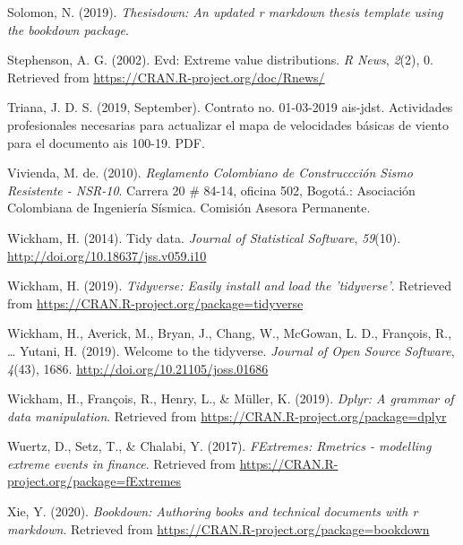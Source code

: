 \documentclass[12pt,oneside]{reedthesis}
\begin{document}
\leavevmode\hypertarget{ref-Solomon2019}{}%
Solomon, N. (2019). \emph{Thesisdown: An updated r markdown thesis template using the bookdown package}.

\leavevmode\hypertarget{ref-Stephenson2002}{}%
Stephenson, A. G. (2002). Evd: Extreme value distributions. \emph{R News}, \emph{2}(2), 0. Retrieved from \url{https://CRAN.R-project.org/doc/Rnews/}

\leavevmode\hypertarget{ref-triana2019}{}%
Triana, J. D. S. (2019, September). Contrato no. 01-03-2019 ais-jdst. Actividades profesionales necesarias para actualizar el mapa de velocidades básicas de viento para el documento ais 100-19. PDF.

\leavevmode\hypertarget{ref-nsr10}{}%
Vivienda, M. de. (2010). \emph{Reglamento Colombiano de Construccción Sismo Resistente - NSR-10}. Carrera 20 \# 84-14, oficina 502, Bogotá.: Asociación Colombiana de Ingeniería Sísmica. Comisión Asesora Permanente.

\leavevmode\hypertarget{ref-Wickham2014}{}%
Wickham, H. (2014). Tidy data. \emph{Journal of Statistical Software}, \emph{59}(10). \url{http://doi.org/10.18637/jss.v059.i10}

\leavevmode\hypertarget{ref-Wickham2019a}{}%
Wickham, H. (2019). \emph{Tidyverse: Easily install and load the 'tidyverse'}. Retrieved from \url{https://CRAN.R-project.org/package=tidyverse}

\leavevmode\hypertarget{ref-Wickham2019b}{}%
Wickham, H., Averick, M., Bryan, J., Chang, W., McGowan, L. D., François, R., \ldots{} Yutani, H. (2019). Welcome to the tidyverse. \emph{Journal of Open Source Software}, \emph{4}(43), 1686. \url{http://doi.org/10.21105/joss.01686}

\leavevmode\hypertarget{ref-Wickham2019}{}%
Wickham, H., François, R., Henry, L., \& Müller, K. (2019). \emph{Dplyr: A grammar of data manipulation}. Retrieved from \url{https://CRAN.R-project.org/package=dplyr}

\leavevmode\hypertarget{ref-Wuertz2017}{}%
Wuertz, D., Setz, T., \& Chalabi, Y. (2017). \emph{FExtremes: Rmetrics - modelling extreme events in finance}. Retrieved from \url{https://CRAN.R-project.org/package=fExtremes}

\leavevmode\hypertarget{ref-Xie2020}{}%
Xie, Y. (2020). \emph{Bookdown: Authoring books and technical documents with r markdown}. Retrieved from \url{https://CRAN.R-project.org/package=bookdown}

\noindent

\setlength{\parindent}{-0.20in}
\setlength{\leftskip}{0.20in}
\setlength{\parskip}{8pt}
\end{document}
